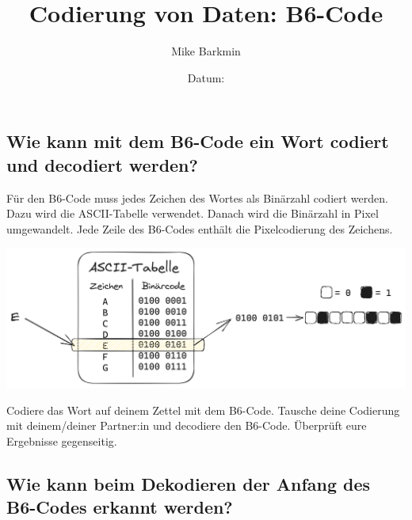 \documentclass[a5paper]{scrartcl}
\title{Codierung von Daten: B6-Code}
\author{Mike Barkmin}
\date{Datum: \hspace{1.5cm}}
\begin{document}
\subsection*{Wie kann mit dem B6-Code ein Wort codiert und decodiert werden?}


Für den B6-Code muss jedes Zeichen des Wortes als Binärzahl codiert werden. Dazu wird die ASCII-Tabelle verwendet. Danach wird die Binärzahl in Pixel umgewandelt. Jede Zeile des B6-Codes enthält die Pixelcodierung des Zeichens.

\begin{center}
	\includegraphics[width=0.9\linewidth]{./zeichen-zu-pixel.excalidraw.png}
\end{center}


\begin{aufgabe}
	\begin{teilaufgaben}
		\teilaufgabe {} Codiere das Wort auf deinem Zettel mit dem B6-Code.
		\teilaufgabe {} Tausche deine Codierung mit deinem/deiner Partner:in und decodiere den B6-Code.
		\teilaufgabe {} Überprüft eure Ergebnisse gegenseitig.
	\end{teilaufgaben}
\end{aufgabe}

\newpage

\subsection*{Wie kann beim Dekodieren der Anfang des B6-Codes erkannt werden?}
\end{document}
